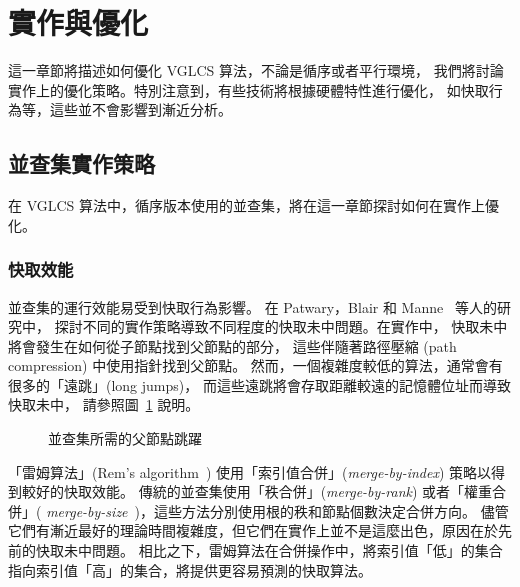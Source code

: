 \section{實作與優化} \label{sec:Implementation}

這一章節將描述如何優化 VGLCS 算法，不論是循序或者平行環境，
我們將討論實作上的優化策略。特別注意到，有些技術將根據硬體特性進行優化，
如快取行為等，這些並不會影響到漸近分析。

\subsection{並查集實作策略}

在 VGLCS 算法中，循序版本使用的並查集，將在這一章節探討如何在實作上優化。

\subsubsection{快取效能}

並查集的運行效能易受到快取行為影響。
在 Patwary，Blair 和 Manne~\cite{Patwary2010ExperimentsOU} 等人的研究中，
探討不同的實作策略導致不同程度的快取未中問題。在實作中，
快取未中將會發生在如何從子節點找到父節點的部分，
這些伴隨著路徑壓縮 (path compression) 中使用指針找到父節點。
然而，一個複雜度較低的算法，通常會有很多的「遠跳」(long jumps)，
而這些遠跳將會存取距離較遠的記憶體位址而導致快取未中，
請參照圖~\ref{fig:long-short-jump-disjoint} 說明。

\begin{figure}[!thb]
  \centering {} 
  \caption{並查集所需的父節點跳躍}
  \label{fig:long-short-jump-disjoint}
\end{figure}

「雷姆算法」(Rem's algorithm~\cite{dijkstra1976a}) 
使用「索引值合併」({\em merge-by-index}) 策略以得到較好的快取效能。
傳統的並查集使用「秩合併」({\em merge-by-rank}) 或者「權重合併」({\em
merge-by-size}~\cite{Tarjan1975EfficiencyOA})，這些方法分別使用根的秩和節點個數決定合併方向。
儘管它們有漸近最好的理論時間複雜度，但它們在實作上並不是這麼出色，原因在於先前的快取未中問題。
相比之下，雷姆算法在合併操作中，將索引值「低」的集合指向索引值「高」的集合，將提供更容易預測的快取算法。

